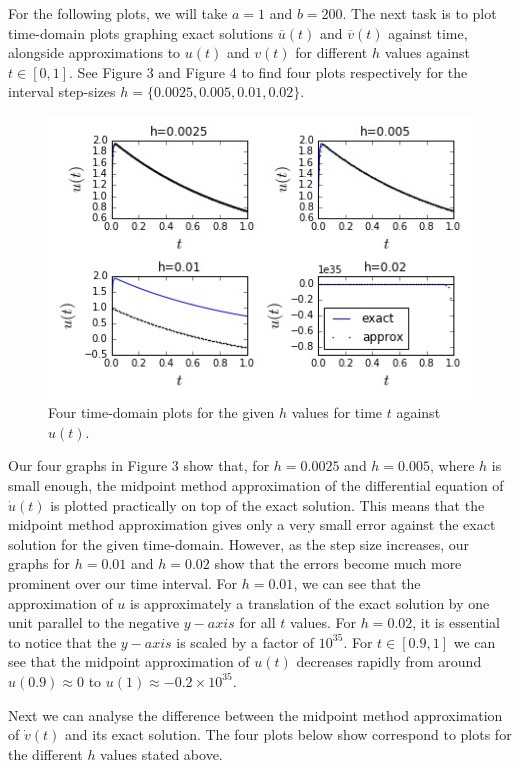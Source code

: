 \documentclass[11pt,a4paper]{article}
\begin{document}
For the following plots, we will take $a=1$ and $b=200$.
The next task is to plot time-domain plots graphing exact solutions $\overline{u}(t)$ and $\overline{v}(t)$ against time, alongside approximations to $u(t)$ and $v(t)$ for different $h$ values against $t\in[0,1]$. See Figure 3 and Figure 4 to find four plots respectively for the interval step-sizes $h=\{0.0025,0.005,0.01,0.02\}$.

\begin{figure}[h]
\caption{Four time-domain plots for the given $h$ values for time $t$ against $u(t)$.}
\includegraphics[scale=0.55]{t_ut_sub.jpg}
\centering
\end{figure}

Our four graphs in Figure 3 show that, for $h=0.0025$ and $h=0.005$, where $h$ is small enough, the midpoint method approximation of the differential equation of $\dot{u}(t)$ is plotted practically on top of the exact solution. This means that the midpoint method approximation gives only a very small error against the exact solution for the given time-domain. However, as the step size increases, our graphs for $h=0.01$ and $h=0.02$ show that the errors become much more prominent over our time interval. For $h=0.01$, we can see that the approximation of $u$ is approximately a translation of the exact solution by one unit parallel to the negative $y-axis$ for all $t$ values. For $h=0.02$, it is essential to notice that the $y-axis$ is scaled by a factor of $10^{35}$. For $t\in[0.9,1]$ we can see that the midpoint approximation of $u(t)$ decreases rapidly from around $u(0.9)\approx 0$ to $u(1)\approx {-0.2}\times 10^{35}$.

Next we can analyse the difference between the midpoint method approximation of $\dot{v}(t)$ and its exact solution. The four plots below show correspond to plots for the different $h$ values stated above.
\end{document}
